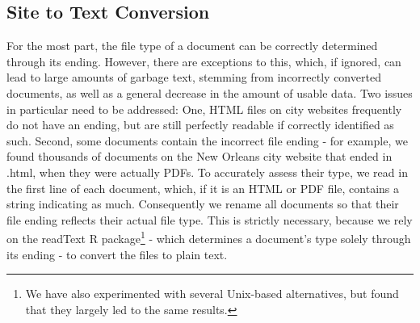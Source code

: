 \documentclass[11pt]{article}
\begin{document}
\subsection{Site to Text Conversion}
For the most part, the file type of a document can be correctly determined through its ending. However, there are exceptions to this, which, if ignored, can lead to large amounts of garbage text, stemming from incorrectly converted documents, as well as a general decrease in the amount of usable data. Two issues in particular need to be addressed: One, HTML files on city websites frequently do not have an ending, but are still perfectly readable if correctly identified as such. Second, some documents contain the incorrect file ending - for example, we found thousands of documents on the New Orleans city website that ended in .html, when they were actually PDFs. To accurately assess their type, we read in the first line of each document, which, if it is an HTML or PDF file, contains a string indicating as much. Consequently we rename all documents so that their file ending reflects their actual file type. This is strictly necessary, because we rely on the readText R package\footnote{We have also experimented with several Unix-based alternatives, but found that they largely led to the same results.} - which determines a document's type solely through its ending - to convert the files to plain text.
\end{document}
